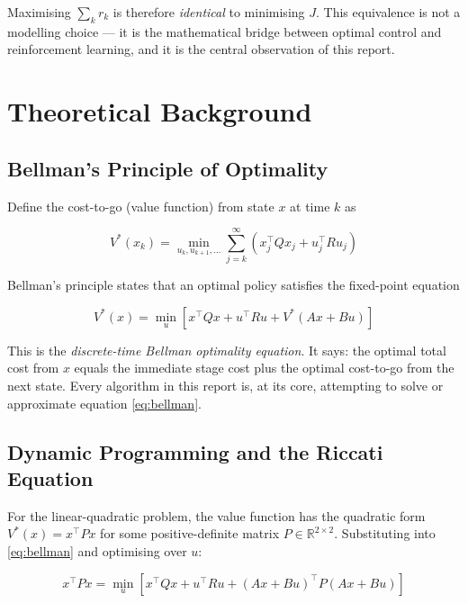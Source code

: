 \documentclass[11pt, a4paper]{article}
\newcommand{\R}{\mathbb{R}}
\newcommand{\T}{^\top}
\begin{document}
Maximising $\sum_{k} r_k$ is therefore \emph{identical} to minimising
$J$. This equivalence is not a modelling choice — it is the
mathematical bridge between optimal control and reinforcement learning,
and it is the central observation of this report.

\section{Theoretical Background}

\subsection{Bellman's Principle of Optimality}

Define the cost-to-go (value function) from state $x$ at time $k$ as

\begin{equation}
  V^*(x_k) = \min_{u_k, u_{k+1},\ldots}
              \sum_{j=k}^{\infty}
              \left( x_j\T Q x_j + u_j\T R u_j \right)
  \label{eq:V}
\end{equation}

Bellman's principle states that an optimal policy satisfies the
fixed-point equation

\begin{equation}
  V^*(x) = \min_{u}
            \left[ x\T Qx + u\T Ru + V^*(Ax + Bu) \right]
  \label{eq:bellman}
\end{equation}

This is the \textit{discrete-time Bellman optimality equation}. It says:
the optimal total cost from $x$ equals the immediate stage cost plus the
optimal cost-to-go from the next state. Every algorithm in this report
is, at its core, attempting to solve or approximate equation
\eqref{eq:bellman}.

\subsection{Dynamic Programming and the Riccati Equation}

For the linear-quadratic problem, the value function has the quadratic
form $V^*(x) = x\T P x$ for some positive-definite matrix $P \in
\R^{2\times 2}$. Substituting into \eqref{eq:bellman} and optimising
over $u$:

\begin{equation}
  x\T Px = \min_{u}
           \left[ x\T Qx + u\T Ru
                  + (Ax+Bu)\T P(Ax+Bu) \right]
\end{equation}
\end{document}
